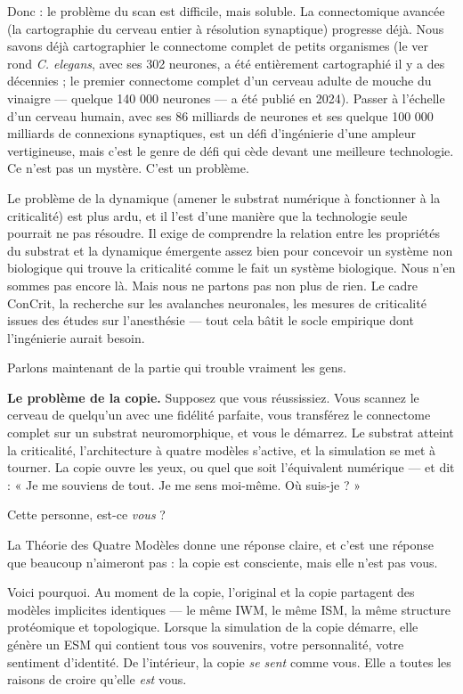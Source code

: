 \documentclass[11pt, twoside, openright]{book}
\begin{document}
Donc : le problème du scan est difficile, mais soluble. La connectomique avancée (la cartographie du cerveau entier à résolution synaptique) progresse déjà. Nous savons déjà cartographier le connectome complet de petits organismes (le ver rond \textit{C. elegans}, avec ses 302 neurones, a été entièrement cartographié il y a des décennies ; le premier connectome complet d'un cerveau adulte de mouche du vinaigre --- quelque 140 000 neurones --- a été publié en 2024). Passer à l'échelle d'un cerveau humain, avec ses 86 milliards de neurones et ses quelque 100 000 milliards de connexions synaptiques, est un défi d'ingénierie d'une ampleur vertigineuse, mais c'est le genre de défi qui cède devant une meilleure technologie. Ce n'est pas un mystère. C'est un problème.

Le problème de la dynamique (amener le substrat numérique à fonctionner à la criticalité) est plus ardu, et il l'est d'une manière que la technologie seule pourrait ne pas résoudre. Il exige de comprendre la relation entre les propriétés du substrat et la dynamique émergente assez bien pour concevoir un système non biologique qui trouve la criticalité comme le fait un système biologique. Nous n'en sommes pas encore là. Mais nous ne partons pas non plus de rien. Le cadre ConCrit, la recherche sur les avalanches neuronales, les mesures de criticalité issues des études sur l'anesthésie --- tout cela bâtit le socle empirique dont l'ingénierie aurait besoin.

Parlons maintenant de la partie qui trouble vraiment les gens.

\textbf{Le problème de la copie.} Supposez que vous réussissiez. Vous scannez le cerveau de quelqu'un avec une fidélité parfaite, vous transférez le connectome complet sur un substrat neuromorphique, et vous le démarrez. Le substrat atteint la criticalité, l'architecture à quatre modèles s'active, et la simulation se met à tourner. La copie ouvre les yeux, ou quel que soit l'équivalent numérique --- et dit : « Je me souviens de tout. Je me sens moi-même. Où suis-je ? »

Cette personne, est-ce \textit{vous} ?

La Théorie des Quatre Modèles donne une réponse claire, et c'est une réponse que beaucoup n'aimeront pas : la copie est consciente, mais elle n'est pas vous.

Voici pourquoi. Au moment de la copie, l'original et la copie partagent des modèles implicites identiques --- le même IWM, le même ISM, la même structure protéomique et topologique. Lorsque la simulation de la copie démarre, elle génère un ESM qui contient tous vos souvenirs, votre personnalité, votre sentiment d'identité. De l'intérieur, la copie \textit{se sent} comme vous. Elle a toutes les raisons de croire qu'elle \textit{est} vous.
\end{document}
